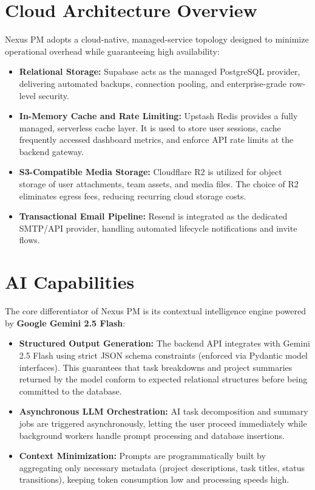 \section{Cloud Architecture Overview}
Nexus PM adopts a cloud-native, managed-service topology designed to minimize operational overhead while guaranteeing high availability:
\begin{itemize}
    \item \textbf{Relational Storage:} Supabase acts as the managed PostgreSQL provider, delivering automated backups, connection pooling, and enterprise-grade row-level security.
    \item \textbf{In-Memory Cache and Rate Limiting:} Upstash Redis provides a fully managed, serverless cache layer. It is used to store user sessions, cache frequently accessed dashboard metrics, and enforce API rate limits at the backend gateway.
    \item \textbf{S3-Compatible Media Storage:} Cloudflare R2 is utilized for object storage of user attachments, team assets, and media files. The choice of R2 eliminates egress fees, reducing recurring cloud storage costs.
    \item \textbf{Transactional Email Pipeline:} Resend is integrated as the dedicated SMTP/API provider, handling automated lifecycle notifications and invite flows.
\end{itemize}

\section{AI Capabilities}
The core differentiator of Nexus PM is its contextual intelligence engine powered by \textbf{Google Gemini 2.5 Flash}:
\begin{itemize}
    \item \textbf{Structured Output Generation:} The backend API integrates with Gemini 2.5 Flash using strict JSON schema constraints (enforced via Pydantic model interfaces). This guarantees that task breakdowns and project summaries returned by the model conform to expected relational structures before being committed to the database.
    \item \textbf{Asynchronous LLM Orchestration:} AI task decomposition and summary jobs are triggered asynchronously, letting the user proceed immediately while background workers handle prompt processing and database insertions.
    \item \textbf{Context Minimization:} Prompts are programmatically built by aggregating only necessary metadata (project descriptions, task titles, status transitions), keeping token consumption low and processing speeds high.
\end{itemize}

